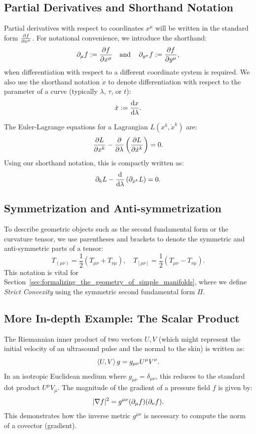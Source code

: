 \subsection{Partial Derivatives and Shorthand Notation} Partial derivatives with respect to coordinates $x^\mu$ will be written in the standard form $\pdv{f}{x^\mu}$. For notational convenience, we introduce the shorthand:
\[%
  \pd{\mu} f := \pdv{f}{x^\mu} \aand \pd{y^\mu} f := \pdv{f}{y^\mu}
,\]%
when differentiation with respect to a different coordinate system is required. We also use the shorthand notation $\dot{x}$ to denote differentiation with respect to the parameter of a curve (typically $\lambda$, $\tau$, or $t$):
\[%
  \dot{x} := \odv{x}{\lambda}
.\]%

\begin{example}
  The Euler-Lagrange equations for a Lagrangian $L(x^k, \dot{x}^k)$ are:
  \[%
    \pdv{L}{x^k} - \pdv{}{\lambda} \left(\pdv{L}{\dot{x}^k}\right) = 0
  .\]%
  Using our shorthand notation, this is compactly written as:
  \[%
    \pd{k} L - \odv{}{\lambda} \left(\pd{\dot{x}^k} L\right) = 0
  .\]%
\end{example}

\subsection{Symmetrization and Anti-symmetrization} To describe geometric objects such as the second fundamental form or the curvature tensor, we use parentheses and brackets to denote the symmetric and anti-symmetric parts of a tensor:
\[%
  T_{(\mu\nu)} = \frac{1}{2}(T_{\mu\nu} + T_{\nu\mu}), \quad T_{[\mu\nu]} = \frac{1}{2}(T_{\mu\nu} - T_{\nu\mu})
.\]%
This notation is vital for Section~\ref{sec:formalizing_the_geometry_of_simple_manifolds}, where we define \emph{Strict Convexity} using the symmetric second fundamental form $\Pi$.

\subsection{More In-depth Example: The Scalar Product} The Riemannian inner product of two vectors $U, V$ (which might represent the initial velocity of an ultrasound pulse and the normal to the skin) is written as:
\[%
  \braket{U, V}g = g_{\mu\nu} U^\mu V^\nu
.\]%
In an isotropic Euclidean medium where $g_{\mu\nu} = \delta_{\mu\nu}$, this reduces to the standard dot product $U^\mu V_\mu$. The magnitude of the gradient of a pressure field $f$ is given by:
\[%
  |\nabla f|^2 = g^{\mu\nu} (\pd{\mu} f) (\pd{\nu} f)
.\]%
This demonstrates how the inverse metric $g^{\mu\nu}$ is necessary to compute the norm of a covector (gradient).
